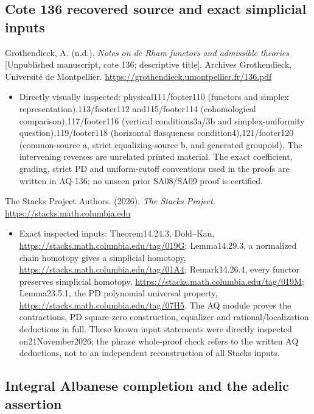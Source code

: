 \documentclass[11pt,a4paper]{article}
\providecommand{\tightlist}{\setlength{\itemsep}{0pt}\setlength{\parskip}{0pt}}
\theoremstyle{definition}\newtheorem{definition}[theorem]{Definition}
\theoremstyle{remark}\newtheorem{remark}[theorem]{Remark}
\begin{document}
\subsection{Cote 136 recovered source and exact simplicial
inputs}\label{cote-136-recovered-source-and-exact-simplicial-inputs}

Grothendieck, A. (n.d.). \emph{Notes on de Rham functors and admissible
theories} {[}Unpublished manuscript, cote 136; descriptive title{]}.
Archives Grothendieck, Université de Montpellier.
\url{https://grothendieck.umontpellier.fr/136.pdf}

\begin{itemize}
\tightlist
\item
  Directly visually inspected: physical111/footer110 (functors and
  simplex representation),113/footer112 and115/footer114 (cohomological
  comparison),117/footer116 (vertical conditions3a/3b and
  simplex-uniformity question),119/footer118 (horizontal flasqueness
  condition4),121/footer120 (common-source a, strict equalizing-source
  b, and generated groupoid). The intervening reverses are unrelated
  printed material. The exact coefficient, grading, strict PD and
  uniform-cutoff conventions used in the proofs are written in AQ-136;
  no unseen prior SA08/SA09 proof is certified.
\end{itemize}

The Stacks Project Authors. (2026). \emph{The Stacks Project}.
\url{https://stacks.math.columbia.edu}

\begin{itemize}
\tightlist
\item
  Exact inspected inputs: Theorem14.24.3, Dold--Kan,
  \url{https://stacks.math.columbia.edu/tag/019G}; Lemma14.29.3, a
  normalized chain homotopy gives a simplicial homotopy,
  \url{https://stacks.math.columbia.edu/tag/01A4}; Remark14.26.4, every
  functor preserves simplicial homotopy,
  \url{https://stacks.math.columbia.edu/tag/019M}; Lemma23.5.1, the PD
  polynomial universal property,
  \url{https://stacks.math.columbia.edu/tag/07H5}. The AQ module proves
  the contractions, PD square-zero construction, equalizer and
  rational/localization deductions in full. These known input statements
  were directly inspected on21November2026; the phrase whole-proof check
  refers to the written AQ deductions, not to an independent
  reconstruction of all Stacks inputs.
\end{itemize}

\subsection{Integral Albanese completion and the adelic
assertion}\label{integral-albanese-completion-and-the-adelic-assertion}
\end{document}
